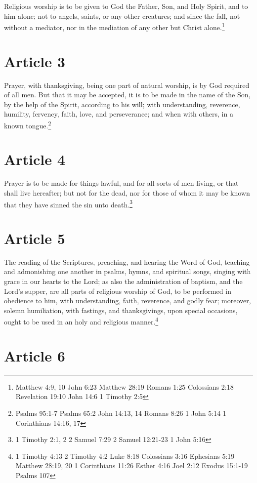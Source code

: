 \documentclass[12pt,letterpaper]{book}
\begin{document}
Religious worship is to be given to God the Father, Son, and Holy Spirit, and to him alone; not to angels, saints, or any other creatures; and since the fall, not without a mediator, nor in the mediation of any other but Christ alone.\footnote{Matthew 4:9, 10 John 6:23 Matthew 28:19 Romans 1:25 Colossians 2:18 Revelation 19:10 John 14:6 1 Timothy 2:5}

\section{Article 3}

Prayer, with thanksgiving, being one part of natural worship, is by God required of all men. But that it may be accepted, it is to be made in the name of the Son, by the help of the Spirit, according to his will; with understanding, reverence, humility, fervency, faith, love, and perseverance; and when with others, in a known tongue.\footnote{Psalms 95:1-7 Psalms 65:2 John 14:13, 14 Romans 8:26 1 John 5:14 1 Corinthians 14:16, 17}

\section{Article 4}

Prayer is to be made for things lawful, and for all sorts of men living, or that shall live hereafter; but not for the dead, nor for those of whom it may be known that they have sinned the sin unto death.\footnote{1 Timothy 2:1, 2 2 Samuel 7:29 2 Samuel 12:21-23 1 John 5:16}

\section{Article 5}

The reading of the Scriptures, preaching, and hearing the Word of God, teaching and admonishing one another in psalms, hymns, and spiritual songs, singing with grace in our hearts to the Lord; as also the administration of baptism, and the Lord's supper, are all parts of religious worship of God, to be performed in obedience to him, with understanding, faith, reverence, and godly fear; moreover, solemn humiliation, with fastings, and thanksgivings, upon special occasions, ought to be used in an holy and religious manner.\footnote{1 Timothy 4:13 2 Timothy 4:2 Luke 8:18 Colossians 3:16 Ephesians 5:19 Matthew 28:19, 20 1 Corinthians 11:26 Esther 4:16 Joel 2:12 Exodus 15:1-19 Psalms 107}

\section{Article 6}
\end{document}
